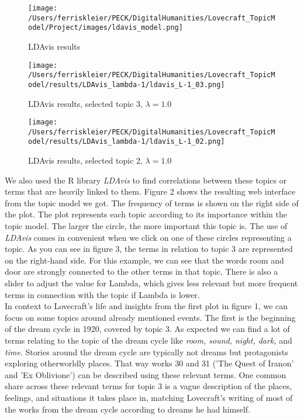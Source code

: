 \begin{figure}[ht]
    \centering
    \texttt{[image: /Users/ferriskleier/PECK/DigitalHumanities/Lovecraft\_TopicModel/Project/images/ldavis\_model.png]}
    \caption{LDAvis results}
    \label{fig:mesh2}
\end{figure}

\begin{figure}[p]
    \centering
    \texttt{[image: /Users/ferriskleier/PECK/DigitalHumanities/Lovecraft\_TopicModel/results/LDAvis\_lambda-1/ldavis\_L-1\_03.png]}
    \caption{LDAvis results, selected topic 3, $\lambda=1.0$}
    \label{fig:mesh3}
\end{figure}

\begin{figure}[p]
    \centering
    \texttt{[image: /Users/ferriskleier/PECK/DigitalHumanities/Lovecraft\_TopicModel/results/LDAvis\_lambda-1/ldavis\_L-1\_02.png]}
    \caption{LDAvis results, selected topic 2, $\lambda=1.0$}
    \label{fig:mesh4}
\end{figure}

We also used the R library \textit{LDAvis} to find correlations between these topics or terms that are heavily 
linked to them. Figure 2 shows the resulting web interface from the topic model we got. The frequency 
of terms is shown on the right side of the plot. The plot represents each topic according to its 
importance within the topic model. The larger the circle, the more important this topic is. The use of 
\textit{LDAvis} comes in convenient when we click on one of these circles representing a topic. As you can see 
in figure 3, the terms in relation to topic 3 are represented on the right-hand side. For this example, 
we can see that the words room and door are strongly connected to the other terms in that topic. There 
is also a slider to adjust the value for Lambda, which gives less relevant but more frequent terms in 
connection with the topic if Lambda is lower.\\

In context to Lovecraft's life and insights from the first plot in figure 1, we can focus on some 
topics around already mentioned events. The first is the beginning of the dream cycle in 1920, covered 
by topic 3. As expected we can find a lot of terms relating to the topic of the dream cycle like \textit{room, 
sound, night, dark,} and \textit{time}. Stories around the dream cycle are typically not dreams but protagonists 
exploring otherworldly places. That way works 30 and 31 ('The Quest of Iranon' and 'Ex Oblivione') can 
be described using these relevant terms. One common share across these relevant terms for topic 3 is a 
vague description of the places, feelings, and situations it takes place in, matching Lovecraft's 
writing of most of the works from the dream cycle according to dreams he had himself.\\

